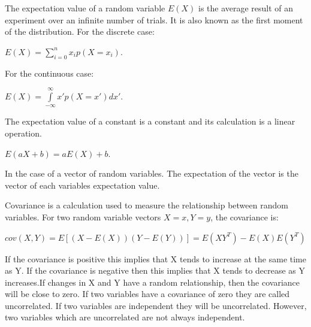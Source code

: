 \documentclass[twoside]{article}
\begin{document}
The expectation value of a random variable $E(X)$ is the average result of an experiment over an infinite number of trials. It is also known as the first moment of the distribution. For the discrete case:

\begin{center}
$E(X)= \sum\limits_{i = 0}^{n} x_ip(X=x_i)$.
\end{center}

For the continuous case:

\begin{center}
$E(X)= \int\limits_{-\infty}^{\infty}  x'p(X=x')dx'$.
\end{center}

The expectation value of a constant is a constant and its calculation is a linear operation.

\begin{center}
$E(aX + b)= aE(X) + b$.
\end{center}

In the case of a vector of random variables. The expectation of the vector is the vector of each variables expectation value.

Covariance is a calculation used to measure the relationship between random variables. For two random variable vectors $X=x, Y=y$, the covariance is:

\begin{center}
$cov(X,Y)=E[(X-E(X))(Y-E(Y))] = E(XY^T) - E(X)E(Y^T)$
\end{center}

If the covariance is positive this implies that X tends to increase at the same time as Y. If the covariance is negative then this implies that X tends to decrease as Y increases.If changes in X and Y have a random relationship, then the covariance will be close to zero. If two variables have a covariance of zero they are called uncorrelated. If two variables are independent they will be uncorrelated. However, two variables which are uncorrelated are not always independent. 



\end{document}
